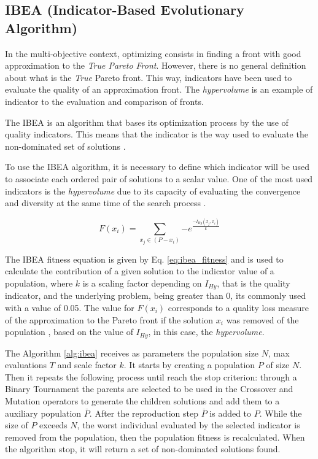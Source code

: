 \subsection{IBEA (Indicator-Based Evolutionary Algorithm)}


In the multi-objective context, optimizing consists in finding a front with good approximation to the \textit{True Pareto Front}. However, there is no general definition about what is the \textit{True} Pareto front. This way, indicators have been used to evaluate the quality of an approximation front. The \textit{hypervolume} is an example of indicator to the evaluation and comparison of fronts.


The IBEA is an algorithm that bases its optimization process by the use of quality indicators. This means that the indicator is the way used to evaluate the non-dominated set of solutions \cite{figueiredo2013algoritmo}.


To use the IBEA algorithm, it is necessary to define which indicator will be used to associate each ordered pair of solutions to a scalar value. One of the most used indicators is the \textit{hypervolume} due to its capacity of evaluating the convergence and diversity at the same time of the search process \cite{ishibuchi2008evolutionary}.


\begin{equation} \label{eq:ibea_fitness}
	F(x_i) = \sum_{x_j \in (P-x_i)} {-e^\frac{-I_{Hy}(x_j,x_i)}{k}}
\end{equation}


The IBEA fitness equation is given by Eq. \ref{eq:ibea_fitness} and is used to calculate the contribution of a given solution to the indicator value of a population, where $k$ is a scaling factor depending on $I_{Hy}$, that is the quality indicator, and the underlying problem, being greater than 0, its commonly used with a value of 0.05. The value for $F(x_i)$ corresponds to a quality loss measure of the approximation to the Pareto front if the solution $x_i$ was removed of the population \cite{figueiredo2013algoritmo}, based on the value of $I_{Hy}$, in this case, the \textit{hypervolume}.


The Algorithm \ref{alg:ibea} receives as parameters the population size $N$, max evaluations $T$ and scale factor $k$. It starts by creating a population $P$ of size $N$. Then it repeats the following process until reach the stop criterion: through a Binary Tournament the parents are selected to be used in the Crossover and Mutation operators to generate the children solutions and add them to a auxiliary population $\overline P$. After the reproduction step $\overline P$ is added to $P$. While the size of $P$ exceeds $N$, the worst individual evaluated by the selected indicator is removed from the population, then the population fitness is recalculated. When the algorithm stop, it will return a set of non-dominated solutions found.


